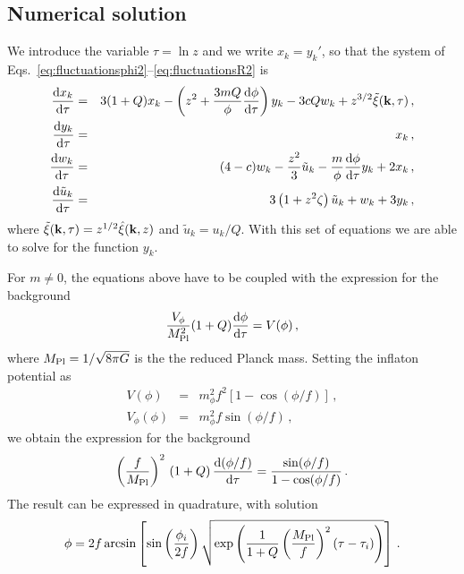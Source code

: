 \subsection{Numerical solution}

We introduce the variable $\tau = \ln z$ and we write $x_k = y_k'$, so that the system of Eqs.~\eqref{eq:fluctuationsphi2}--\eqref{eq:fluctuationsR2} is
\begin{eqnarray}
	\frac{{\rm d}x_k}{{\rm d}\tau} &=& 3(1+Q)x_k - \left(z^2 + \frac{3mQ}{\phi}\frac{{\rm d}\phi}{{\rm d}\tau}\right)y_k - 3cQw_k + z^{3/2}\tilde\xi({\bf k}, \tau)\,,\label{eq:fluctuationsphi3}\\
	\frac{{\rm d}y_k}{{\rm d}\tau} &=& x_k\,,\\
	\frac{{\rm d}w_k}{{\rm d}\tau} &=& (4-c)w_k - \frac{z^2}{3}\tilde u_k - \frac{m}{\phi}\frac{{\rm d}\phi}{{\rm d}\tau} y_k + 2x_k\,,\label{eq:fluctuationsR3}\\
	\frac{{\rm d}\tilde u_k}{{\rm d}\tau} &=& 3\left(1+z^2\zeta\right)\tilde u_k + w_k + 3y_k\,,\label{eq:fluctuationsPsi3}
\end{eqnarray}
where $\tilde\xi({\bf k}, \tau) = z^{1/2}\hat\xi({\bf k}, z)$ and $\tilde u_k = u_k/Q$. With this set of equations we are able to solve for the function $y_k$.

For $m\neq 0$, the equations above have to be coupled with the expression for the background
\begin{equation}
    \frac{V_\phi}{M_{\rm Pl}^2} (1 + Q) \frac{{\rm d}\phi}{{\rm d}\tau} = V(\phi)\,,  
\end{equation}
where $M_{\rm Pl} = 1/\sqrt{8\pi G}$ is the the reduced Planck mass. Setting the inflaton potential as
\begin{eqnarray}
    V(\phi) &=& m_\phi^2 f^2\left[1-\cos(\phi/f)\right]\,, \\   
    V_\phi(\phi) &=& m_\phi^2 f\sin(\phi/f)\,,    
\end{eqnarray}
we obtain the expression for the background
\begin{equation}
    \left(\frac{f}{M_{\rm Pl}}\right)^2\,(1 + Q)\,\frac{{\rm d}(\phi/f)}{{\rm d}\tau} =  \frac{\sin(\phi/f)}{1-\cos(\phi/f)}\,. 
\end{equation}
The result can be expressed in quadrature, with solution
\begin{equation}
    \phi= 2 f \arcsin\left[\sin\left(\frac{\phi_i}{2f}\right)\sqrt{\exp\left(\frac{1}{1 + Q}\left(\frac{M_{\rm Pl}}{f}\right)^2(\tau - \tau_i)\right)}\right]\,.
\end{equation}






